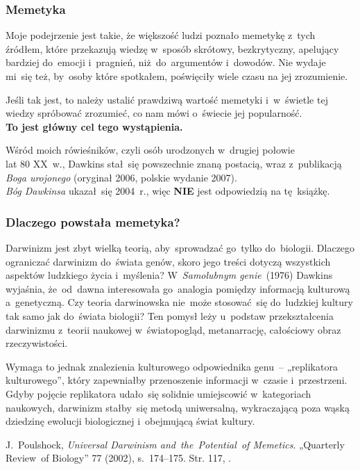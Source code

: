 \documentclass[10pt,t]{beamer}
\begin{document}
\begin{frame}
  \frametitle{Memetyka}


  Moje podejrzenie jest takie, że większość ludzi poznało
  memetykę z~tych źródłem, które przekazują wiedzę w~sposób skrótowy,
  bezkrytyczny, apelujący bardziej do~emocji i~pragnień, niż~do~argumentów
  i~dowodów. Nie wydaje mi~się też, by~osoby które spotkałem, poświęciły
  wiele czasu na jej zrozumienie.


  Jeśli tak jest, to należy ustalić prawdziwą wartość memetyki i~w~świetle
  tej wiedzy spróbować zrozumieć, co nam mówi o~świecie jej popularność. \\
  \textbf{To jest główny cel tego wystąpienia.}

  Wśród moich rówieśników, czyli osób urodzonych w~drugiej połowie \\
  lat 80 XX~w., Dawkins stał~się powszechnie znaną postacią, wraz
  z~publikacją \textit{Boga urojonego} (oryginał 2006, polskie wydanie
  2007). \\
  \textit{Bóg Dawkinsa} ukazał~się 2004~r., więc \textbf{NIE} jest
  odpowiedzią na tę~książkę.

\end{frame}





\begin{frame}
  \frametitle{Dlaczego powstała memetyka?}


  Darwinizm jest zbyt wielką teorią, aby~sprowadzać
  go~tylko do~biologii. Dlaczego ograniczać darwinizm do~świata
  genów, skoro jego treści dotyczą wszystkich aspektów ludzkiego
  życia i~myślenia? W~\textit{Samolubnym genie}~(1976) Dawkins
  wyjaśnia, że~od~dawna interesowała go~analogia pomiędzy informacją
  kulturową a~genetyczną. Czy teoria darwinowska nie~może
  stosować~się do~ludzkiej kultury tak samo jak do~świata biologii?
  Ten pomysł leży u~podstaw przekształcenia darwinizmu z~teorii
  naukowej w~światopogląd, metanarrację, całościowy obraz
  rzeczywistości.

  Wymaga to jednak znalezienia kulturowego odpowiednika
  genu~-- „replikatora kulturowego”, który zapewniałby
  przenoszenie informacji w~czasie i~przestrzeni. Gdyby pojęcie
  replikatora udało~się solidnie umiejscowić w~kategoriach
  naukowych, darwinizm stałby~się metodą uniwersalną, wykraczającą
  poza wąską dziedzinę ewolucji biologicznej i~obejmującą świat
  kultury.

  J.~Poulshock, \textit{Universal Darwinism
    and~the~Potential~of Memetics}. „Quarterly Review~of Biology”
  77 (2002), s.~174--175. Str. 117, \cite{McGrathBogDawkinsa2008}.

\end{frame}
\end{document}
